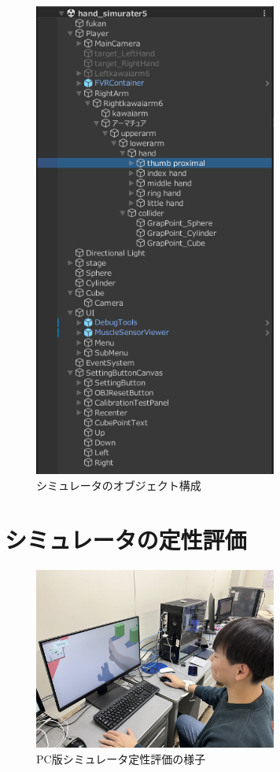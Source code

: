 \documentclass{ltjsreport}
\begin{document}
		\begin{figure}[H]
		\centering
		\includegraphics[width = 8cm]{../figs/UnityObject.png}
		\caption{シミュレータのオブジェクト構成}
		\label{fig:object}
		\end{figure}

	\section{シミュレータの定性評価}
		\begin{figure}[H]
		\centering
		\includegraphics[width = 8cm]{../figs/IMG_5132.JPG}
		\caption{PC版シミュレータ定性評価の様子}
		\label{fig:evaluationPC}
		\end{figure}
\end{document}
